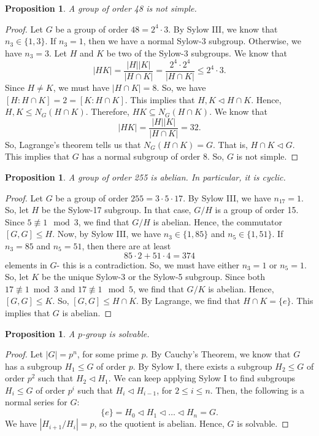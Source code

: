\documentclass[a4paper, openany]{memoir}
\theoremstyle{definition}
\theoremstyle{plain}
\newtheorem{proposition}[definition]{Proposition}
\begin{document}
    \begin{proposition}
        A group of order 48 is not simple.
    \end{proposition}
    \begin{proof}
        Let $G$ be a group of order $48 = 2^4 \cdot 3$. By Sylow III, we know that $n_3 \in \{1, 3\}$. If $n_3 = 1$, then we have a normal Sylow-$3$ subgroup. Otherwise, we have $n_3 = 3$. Let $H$ and $K$ be two of the Sylow-$3$ subgroups. We know that
        \[|HK| = \frac{|H| |K|}{|H \cap K|} = \frac{2^4 \cdot 2^4}{|H \cap K|} \leq 2^4 \cdot 3.\]
        Since $H \neq K$, we must have $|H \cap K| = 8$. So, we have $[H: H \cap K] = 2 = [K: H \cap K]$. This implies that $H, K \vartriangleleft H \cap K$. Hence, $H, K \leq N_G(H \cap K)$. Therefore, $HK \subseteq N_G(H \cap K)$. We know that
        \[|HK| = \frac{|H| |K|}{|H \cap K|} = 32.\]
        So, Lagrange's theorem tells us that $N_G(H \cap K) = G$. That is, $H \cap K \vartriangleleft G$. This implies that $G$ has a normal subgroup of order $8$. So, $G$ is not simple.
    \end{proof}

    \begin{proposition}
        A group of order 255 is abelian. In particular, it is cyclic.
    \end{proposition}
    \begin{proof}
        Let $G$ be a group of order $255 = 3 \cdot 5 \cdot 17$. By Sylow III, we have $n_{17} = 1$. So, let $H$ be the Sylow-17 subgroup. In that case, $G/H$ is a group of order 15. Since $5 \not\equiv 1 \mod{3}$, we find that $G/H$ is abelian. Hence, the commutator $[G, G] \leq H$. Now, by Sylow III, we have $n_3 \in \{1, 85\}$ and $n_5 \in \{1, 51\}$. If $n_3 = 85$ and $n_5 = 51$, then there are at least
        \[85 \cdot 2 + 51 \cdot 4 = 374\]
        elements in $G$- this is a contradiction. So, we must have either $n_3 = 1$ or $n_5 = 1$. So, let $K$ be the unique Sylow-3 or the Sylow-5 subgroup. Since both $17 \not\equiv 1 \bmod{3}$ and $17 \not\equiv 1 \mod{5}$, we find that $G/K$ is abelian. Hence, $[G, G] \leq K$. So, $[G, G] \leq H \cap K$. By Lagrange, we find that $H \cap K = \{e\}$. This implies that $G$ is abelian.
    \end{proof}

    \begin{proposition}
        A $p$-group is solvable.
    \end{proposition}
    \begin{proof}
        Let $|G| = p^n$, for some prime $p$. By Cauchy's Theorem, we know that $G$ has a subgroup $H_1 \leq G$ of order $p$. By Sylow I, there exists a subgroup $H_2 \leq G$ of order $p^2$ such that $H_2 \vartriangleleft H_1$. We can keep applying Sylow I to find subgroups $H_i \leq G$ of order $p^i$ such that $H_i \vartriangleleft H_{i-1}$, for $2 \leq i \leq n$. Then, the following is a normal series for $G$:
        \[\{e\} = H_0 \vartriangleleft H_1 \vartriangleleft \dots \vartriangleleft H_n = G.\]
        We have $|H_{i+1}/H_i| = p$, so the quotient is abelian. Hence, $G$ is solvable.
    \end{proof}
\end{document}
